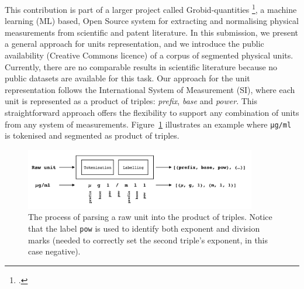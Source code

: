 \documentclass[a4paper,11pt]{article}
\begin{document}
This contribution is part of a larger project called Grobid-quantities \footcite{grobid-quantities}, a machine learning (ML) based, Open Source system for extracting and normalising physical measurements from scientific and patent literature. 
In this submission, we present a general approach for units representation, and we introduce the public availability (Creative Commons licence) of a corpus of segmented physical units. 
Currently, there are no comparable results in scientific literature because no public datasets are available for this task.
Our approach for the unit representation follows the International System of Measurement (SI), where each unit is represented as a product of triples: \textit{prefix}, \textit{base} and \textit{power}. This straightforward approach offers the flexibility to support any combination of units from any system of measurements. 
Figure~\ref{fig:dataset example} illustrates an example where \texttt{µg/ml} is tokenised and segmented as product of triples.
\begin{figure}[h]
    \centering
    \includegraphics[width=0.9\textwidth,natwidth=527,natheight=124]{system-schema.png}
    \caption[] {The process of parsing a raw unit into the product of triples. Notice that the label \texttt{pow} is used to identify both exponent and division marks (needed to correctly set the second triple's exponent, in this case negative).}
    \label{fig:dataset example}
\end{figure}
\end{document}
